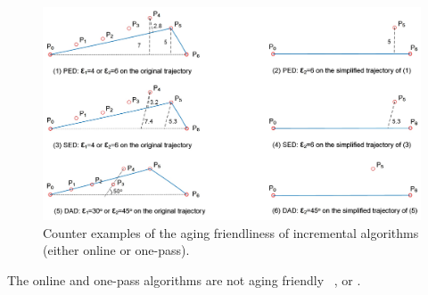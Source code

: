 \begin{figure}[tb!]
	\centering
	\includegraphics[scale=0.66]{Figures/Fig-aging-incre.jpg}
	\vspace{-1ex}
	\caption{\small Counter examples of the aging friendliness of incremental algorithms (either online or one-pass).}
	\vspace{-1ex}
	\label{fig:aging-incre}
\end{figure}

\begin{proposition}
	\label{theo-aging-online}
	The online and one-pass algorithms are not aging friendly \wrt~\ped, \sed or \dad.

\end{proposition}

